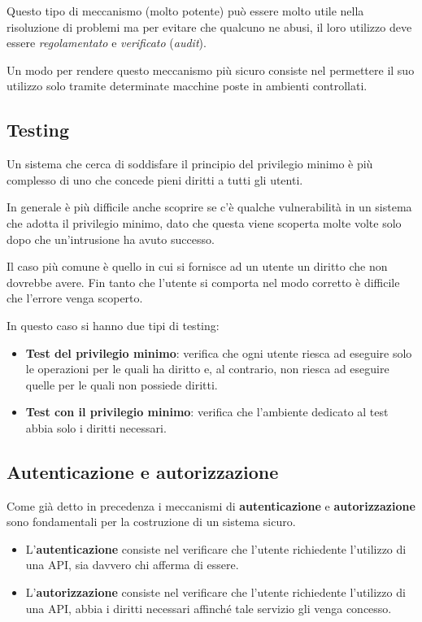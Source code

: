Questo tipo di meccanismo (molto potente) può essere molto utile nella risoluzione di problemi ma per evitare che
qualcuno ne abusi, il loro utilizzo deve essere \emph{regolamentato} e \emph{verificato} (\emph{audit}).

Un modo per rendere questo meccanismo più sicuro consiste nel permettere il suo utilizzo solo tramite determinate
macchine poste in ambienti controllati.

\subsection{Testing}
Un sistema che cerca di soddisfare il principio del privilegio minimo è più complesso di uno che concede pieni diritti
a tutti gli utenti.

In generale è più difficile anche scoprire se c'è qualche vulnerabilità in un sistema che adotta il privilegio minimo,
dato che questa viene scoperta molte volte solo dopo che un'intrusione ha avuto successo.

Il caso più comune è quello in cui si fornisce ad un utente un diritto che non dovrebbe avere. Fin tanto che l'utente
si comporta nel modo corretto è difficile che l'errore venga scoperto.

In questo caso si hanno due tipi di testing:
\begin{itemize}
	\item \textbf{Test del privilegio minimo}: verifica che ogni utente riesca ad eseguire solo le operazioni per le
	      quali ha diritto e, al contrario, non riesca ad eseguire quelle per le quali non possiede diritti.
	\item \textbf{Test con il privilegio minimo}: verifica che l'ambiente dedicato al test abbia solo i diritti
	      necessari.
\end{itemize}

\subsection{Autenticazione e autorizzazione}
Come già detto in precedenza i meccanismi di \textbf{autenticazione} e \textbf{autorizzazione} sono fondamentali per
la costruzione di un sistema sicuro.
\begin{itemize}
	\item L'\textbf{autenticazione} consiste nel verificare che l'utente richiedente l'utilizzo di una API, sia davvero
	      chi afferma di essere.
	\item L'\textbf{autorizzazione} consiste nel verificare che l'utente richiedente l'utilizzo di una API, abbia i
	      diritti necessari affinché tale servizio gli venga concesso.
\end{itemize}

